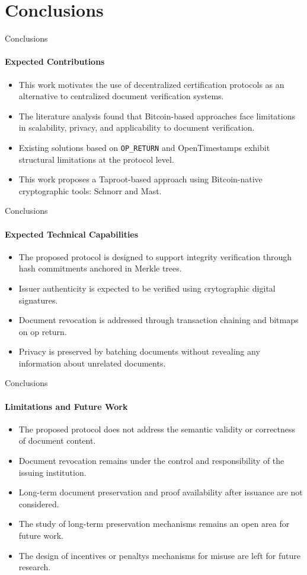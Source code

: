 \section{Conclusions}
\begin{frame}{Conclusions}
\framesubtitle{Expected Contributions}
\begin{itemize}
    \item This work motivates the use of decentralized certification protocols as an alternative to centralized document verification systems.
    \item The literature analysis found that Bitcoin-based approaches face limitations in scalability, privacy, and applicability to document verification.
    \item Existing solutions based on \texttt{OP\_RETURN} and OpenTimestamps exhibit structural limitations at the protocol level.
    \item This work proposes a Taproot-based approach using Bitcoin-native cryptographic tools: Schnorr and Mast.
\end{itemize}
\end{frame}

\begin{frame}{Conclusions}
\framesubtitle{Expected Technical Capabilities}
\begin{itemize}
    \item The proposed protocol is designed to support integrity verification through hash commitments anchored in Merkle trees.
    \item Issuer authenticity is expected to be verified using crytographic digital signatures.
    \item Document revocation is addressed through transaction chaining and bitmaps on op return.
    \item Privacy is preserved by batching documents without revealing any information about unrelated documents.
\end{itemize}
\end{frame}


\begin{frame}{Conclusions}
\framesubtitle{Limitations and Future Work}
\begin{itemize}
    \item The proposed protocol does not address the semantic validity or correctness of document content.
    \item Document revocation remains under the control and responsibility of the issuing institution.
    \item Long-term document preservation and proof availability after issuance are not considered.
    \item The study of long-term preservation mechanisms remains an open area for future work.
    \item The design of incentives or penaltys mechanisms for misuse are left for future research.
\end{itemize}
\end{frame}
